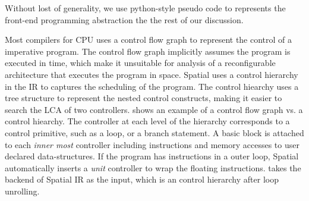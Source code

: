 Without lost of generality, we use python-style pseudo code to represents the front-end programming
abstraction the the rest of our discussion.

Most compilers for CPU uses a control flow graph to represent the control of a imperative program.
The control flow graph implicitly assumes the program is executed in time, which make it unsuitable
for analysis of a reconfigurable architecture that executes the program in space. 
Spatial uses a control hierarchy in the IR to captures the scheduling of the program.
The control hiearchy uses a tree structure to represent the nested control constructs, making it
easier to search the LCA of two controllers.
 shows an example of a control flow graph vs. a control hiearchy.
The controller at each level of the hierarchy corresponds to a control primitive, such as a loop, or
a branch statement. 
A basic block is attached to each \emph{inner most} controller including instructions
and memory accesses to user declared data-structures.
If the program has instructions in a outer loop, Spatial automatically inserts a \emph{unit}
controller to wrap the floating instructions.
\name takes the backend of Spatial IR as the input, which is an control hierarchy after loop
unrolling.

